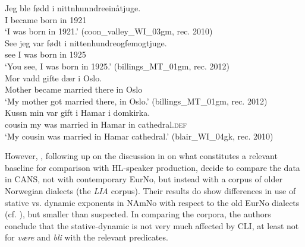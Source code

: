 \documentclass[output=paper]{langscibook}
\begin{document}
    \gll     Jeg ble fødd i nittnhunndreeinåtjuge.      \\
             I became born in 1921          \\
    \glt     ‘I was born in 1921.’   (coon\_valley\_WI\_03gm, rec. 2010)\\
    \ex \label{ex:eide:16b} 
    \gll     See jeg var født i nittenhundreogfemogtjuge.    \\
             see I was born in 1925          \\
    \glt     ‘You see, I was born in 1925.’ ({{billings\_MT\_01gm}}, rec. 2012)\\
    \ex \label{ex:eide:16c} 
    \gll      Mor vadd gifte dær i Oslo.        \\
              Mother became married there in Oslo       \\
    \glt     ‘My mother got married there, in Oslo.’ (billings\_MT\_01gm, rec. 2012)\\
    \ex \label{ex:eide:16d} 
    \gll Kussn min var gift i Hamar i domkirka.      \\
         cousin my was married in Hamar in cathedral.\textsc{def}\\
    \glt ‘My cousin was married in Hamar cathedral.’ (blair\_WI\_04gk, rec. 2010)\\
    \z %
\z
 

However, \citet{EikLaanemets2021}, following up on the discussion in \citet[100--102]{Lykke2020} on what constitutes a relevant baseline for comparison with HL-speaker production, decide to compare the data in CANS, not with contemporary EurNo, but instead with a corpus of older Norwegian dialects (the \textit{LIA} corpus). Their results do show differences in use of stative vs. dynamic exponents in NAmNo with respect to the old EurNo dialects (cf. ), but smaller than suspected. In comparing the corpora, the authors conclude that the stative-dynamic is not very much affected by CLI, at least not for \textit{være} and \textit{bli} with the relevant predicates. 
\end{document}
